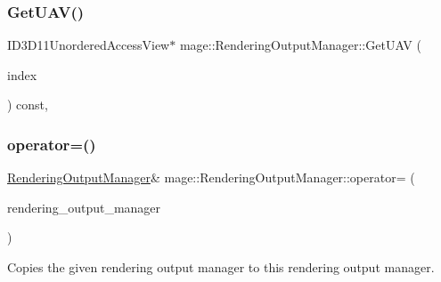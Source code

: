 \hypertarget{classmage_1_1_rendering_output_manager_a69f782de38807401a5ee6ab4d47a928c}{}\label{classmage_1_1_rendering_output_manager_a69f782de38807401a5ee6ab4d47a928c} 
\subsubsection{\texorpdfstring{Get\+U\+A\+V()}{GetUAV()}}
{\footnotesize\ttfamily I\+D3\+D11\+Unordered\+Access\+View$\ast$ mage\+::\+Rendering\+Output\+Manager\+::\+Get\+U\+AV (\begin{DoxyParamCaption}\item[{\hyperlink{classmage_1_1_rendering_output_manager_a34cdd58dd0dda9d78878d79aa3393b89}{U\+A\+V\+Index}}]{index }\end{DoxyParamCaption}) const\hspace{0.3cm}{\ttfamily [private]}, {\ttfamily [noexcept]}}

\hypertarget{classmage_1_1_rendering_output_manager_a486005f24c4ba471522e827574099c0b}{}\label{classmage_1_1_rendering_output_manager_a486005f24c4ba471522e827574099c0b} 
\subsubsection{\texorpdfstring{operator=()}{operator=()}\hspace{0.1cm}{\footnotesize\ttfamily [1/2]}}
{\footnotesize\ttfamily \hyperlink{classmage_1_1_rendering_output_manager}{Rendering\+Output\+Manager}\& mage\+::\+Rendering\+Output\+Manager\+::operator= (\begin{DoxyParamCaption}\item[{const \hyperlink{classmage_1_1_rendering_output_manager}{Rendering\+Output\+Manager} \&}]{rendering\+\_\+output\+\_\+manager }\end{DoxyParamCaption})\hspace{0.3cm}{\ttfamily [delete]}}

Copies the given rendering output manager to this rendering output manager.


